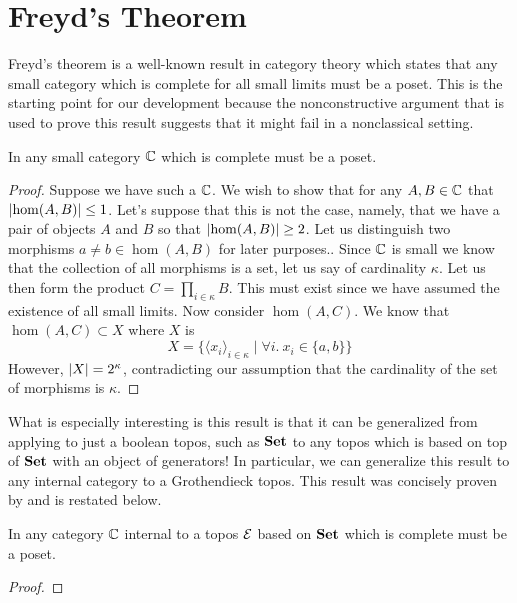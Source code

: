 \section{Freyd's Theorem}\label{sec:freyd}

Freyd's theorem is a well-known result in category theory which states
that any small category which is complete for all small limits must be
a poset. This is the starting point for our development because the
nonconstructive argument that is used to prove this result suggests
that it might fail in a nonclassical setting.
\begin{thm}\label{thm:freyd:freyd}
  In any small category $\mathbb{C}$ which is complete must be a poset.
\end{thm}
\begin{proof}
  Suppose we have such a $\mathbb{C}$. We wish to show that for any
  $A, B \in \mathbb{C}$ that $\left\vert\hom(A, B)\right\vert \le 1$. Let's suppose that
  this is not the case, namely, that we have a pair of objects $A$ and
  $B$ so that $\left\vert\hom(A, B)\right\vert \ge 2$. Let us distinguish two
  morphisms $a \neq b \in \hom(A, B)$ for later purposes.. Since
  $\mathbb{C}$ is small we know that the collection of all morphisms is a
  set, let us say of cardinality $\kappa$. Let us then form the
  product $C = \prod_{i \in \kappa} B$. This must exist since we have
  assumed the existence of all small limits. Now consider
  $\hom(A, C)$. We know that $\hom(A, C) \subset X$ where $X$ is
  \[
    X = \{\langle x_i \rangle_{i \in \kappa}\mid \forall i.\ x_i \in \{a, b\}\}
  \]
  However, $\left\vert X\right\vert = 2^\kappa$, contradicting our assumption that
  the cardinality of the set of morphisms is $\kappa$.
\end{proof}

What is especially interesting is this result is that it can be
generalized from applying to just a boolean topos, such as $\mathbf{Set}$ to
any topos which is based on top of $\mathbf{Set}$ with an object of
generators! In particular, we can generalize this result to any
internal category to a Grothendieck topos. This result was concisely
proven by \citet{Gubkin:10} and is restated below.
\begin{thm}\label{thm:freyd:grothendieck}
  In any category $\mathbb{C}$ internal to a topos $\mathcal{E}$ based on $\mathbf{Set}$
  which is complete must be a poset.
\end{thm}
\begin{proof}
\end{proof}


